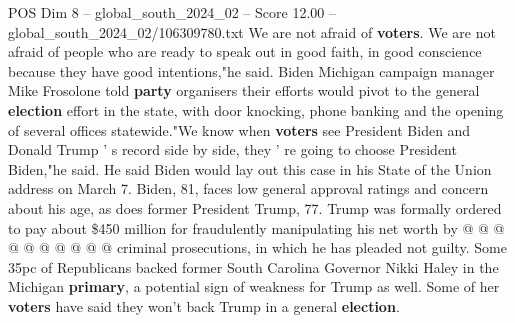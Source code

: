 \begin{textsample}{POS Dim 8 – global\_south\_2024\_02 – Score 12.00 – global\_south\_2024\_02/106309780.txt}
We are not afraid of \textbf{voters}.
We are not afraid of people who are ready to speak out in good faith, in good conscience because they have good intentions,"he said.
Biden Michigan campaign manager Mike Frosolone told \textbf{party} organisers their efforts would pivot to the general \textbf{election} effort in the state, with door knocking, phone banking and the opening of several offices statewide."We know when \textbf{voters} see President Biden and Donald Trump ' s record side by side, they ' re going to choose President Biden,"he said.
He said Biden would lay out this case in his State of the Union address on March 7.
Biden, 81, faces low general approval ratings and concern about his age, as does former President Trump, 77.
Trump was formally ordered to pay about \$450 million for fraudulently manipulating his net worth by @ @ @ @ @ @ @ @ @ @ criminal prosecutions, in which he has pleaded not guilty.
Some 35pc of Republicans backed former South Carolina Governor Nikki Haley in the Michigan \textbf{primary}, a potential sign of weakness for Trump as well.
Some of her \textbf{voters} have said they won't back Trump in a general \textbf{election}.

\end{textsample}
